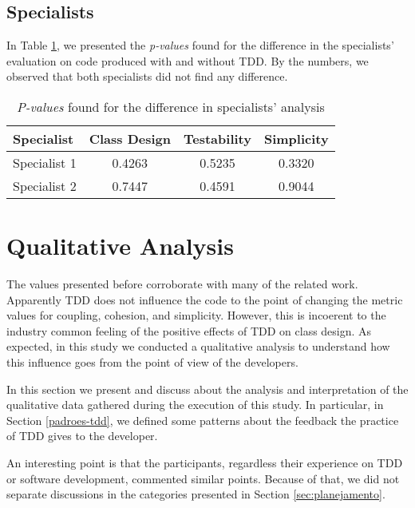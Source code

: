 \documentclass[conference]{IEEEtran}
\begin{document}
\subsection{Specialists}

In Table
\ref{tab:especialistas-industria}, we presented the \textit{p-values} found for the
difference in the specialists' evaluation on code produced with and without TDD.
By the numbers, we observed that both specialists did not find any difference.

\begin{table}[h!]
	\centering
	\begin{tabular}{| p{2cm} | c | c | c | }
		\hline
		\textbf{Specialist} & \textbf{Class Design} & \textbf{Testability} & \textbf{Simplicity}\\
		\hline
		Specialist 1 &	0.4263 &	0.5235 &	0.3320\\
		Specialist 2 &	0.7447 &	0.4591 &	0.9044\\
		\hline
	\end{tabular}
	\caption{\textit{P-values} found for the difference in specialists' analysis}
	\label{tab:especialistas-industria}
\end{table}

\section{Qualitative Analysis}

The values presented before corroborate with many of the related work.
Apparently TDD does not influence the code to the point of changing
the metric values for coupling, cohesion, and simplicity. However, this is
incoerent to the industry common feeling of the positive effects of TDD on class design.
As expected, in this study we conducted a qualitative analysis to understand
how this influence goes from the point of view of the developers.

In this section we present and discuss about the analysis and interpretation of
the qualitative data gathered during the execution of this study. In particular,
in Section \ref{padroes-tdd}, we defined some patterns about the feedback the practice
of TDD gives to the developer.

An interesting point is that the participants, regardless their experience on TDD or
software development, commented similar points. Because of that, we did not separate
discussions in the categories presented in Section \ref{sec:planejamento}.
\end{document}
